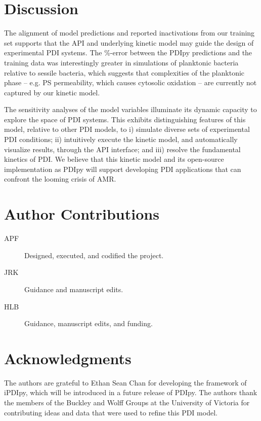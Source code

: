 \section*{Discussion}
The alignment of model predictions and reported inactivations from our training set supports that the API and underlying kinetic model may guide the design of experimental PDI systems. The \%-error between the PDIpy predictions and the training data was interestingly greater in simulations of planktonic bacteria relative to sessile bacteria, which suggests that complexities of the planktonic phase -- e.g. PS permeability, which causes cytosolic oxidation -- are currently not captured by our kinetic model. 

The sensitivity analyses of the model variables illuminate its dynamic capacity to explore the space of PDI systems. This exhibits distinguishing features of this model, relative to other PDI models, to i) simulate diverse sets of experimental PDI conditions; ii) intuitively execute the kinetic model, and automatically visualize results, through the API interface; and iii) resolve the fundamental kinetics of PDI. We believe that this kinetic model and its open-source implementation as PDIpy will support developing PDI applications that can confront the looming crisis of AMR.

\section{Author Contributions}
\begin{description}
    \item[APF] Designed, executed, and codified the project.
    \item[JRK] Guidance and manuscript edits.
    \item[HLB] Guidance, manuscript edits, and funding.
\end{description}

\section{Acknowledgments}
The authors are grateful to Ethan Sean Chan for developing the framework of iPDIpy, which will be introduced in a future release of PDIpy. The authors thank the members of the Buckley and Wolff Groups at the University of Victoria for contributing ideas and data that were used to refine this PDI model. 